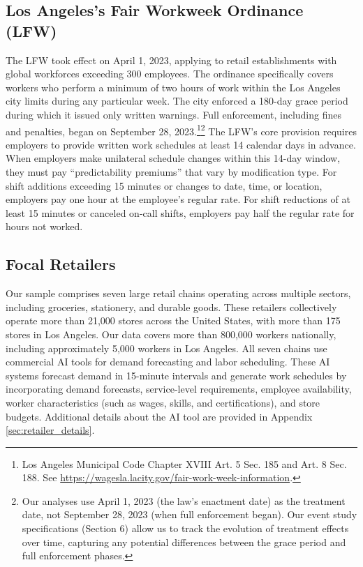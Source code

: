 \documentclass[letterpaper,11pt,leqno]{article}
\theoremstyle{paper}
\begin{document}
\subsection{Los Angeles's Fair Workweek Ordinance (LFW)} \label{subsec:losangeles_fw_intro}
The LFW took effect on April 1, 2023, applying to retail establishments with global workforces exceeding 300 employees. The ordinance specifically covers workers who perform a minimum of two hours of work within the Los Angeles city limits during any particular week. The city enforced a 180-day grace period during which it issued only written warnings. Full enforcement, including fines and penalties, began on September 28, 2023.\footnote{Los Angeles Municipal Code Chapter XVIII Art. 5 Sec. 185 and Art. 8 Sec. 188. See \url{https://wagesla.lacity.gov/fair-work-week-information}.}\footnote{Our analyses use April 1, 2023 (the law's enactment date) as the treatment date, not September 28, 2023 (when full enforcement began). Our event study specifications (Section 6) allow us to track the evolution of treatment effects over time, capturing any potential differences between the grace period and full enforcement phases.} The LFW's core provision requires employers to provide written work schedules at least 14 calendar days in advance. When employers make unilateral schedule changes within this 14-day window, they must pay ``predictability premiums'' that vary by modification type. For shift additions exceeding 15 minutes or changes to date, time, or location, employers pay one hour at the employee's regular rate. For shift reductions of at least 15 minutes or canceled on-call shifts, employers pay half the regular rate for hours not worked. 


\subsection{Focal Retailers} \label{subsec:focal_retailers}
Our sample comprises seven large retail chains operating across multiple sectors, including groceries, stationery, and durable goods. These retailers collectively operate more than 21,000 stores across the United States, with more than 175 stores in Los Angeles. Our data covers more than 800,000 workers nationally, including approximately 5,000 workers in Los Angeles. All seven chains use commercial AI tools for demand forecasting and labor scheduling. These AI systems forecast demand in 15-minute intervals and generate work schedules by incorporating demand forecasts, service-level requirements, employee availability, worker characteristics (such as wages, skills, and certifications), and store budgets. Additional details about the AI tool are provided in Appendix \ref{sec:retailer_details}. 
\end{document}
